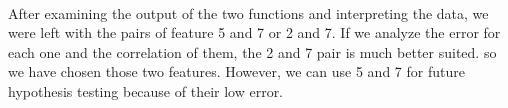 \documentclass{article}
\begin{document}
    \\ After examining the output of the two functions and interpreting the data, we were left with the pairs of feature 5 and 7 or 2 and 7. If we analyze the error for each one and the correlation of them, the 2 and 7 pair is much better suited. so we have chosen those two features. However, we can use 5 and 7 for future hypothesis testing because of their low error.
\end{document}
